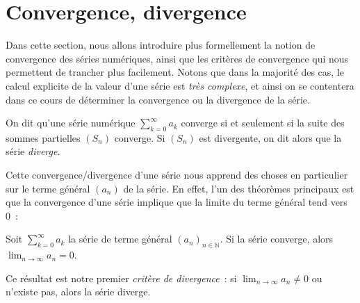 


\section{Convergence, divergence}
Dans cette section, nous allons introduire plus formellement la notion de convergence des séries numériques, ainsi que les critères de convergence qui nous permettent de trancher plus facilement. Notons que dans la majorité des cas, le calcul explicite de la valeur d'une série est \emph{très complexe}, et ainsi on se contentera dans ce cours de déterminer la convergence ou la divergence de la série.

\begin{boxdef}
On dit qu'une série numérique $\displaystyle\sum_{k=0}^{\infty} a_k$ converge si et seulement si la suite des sommes partielles $(S_n)$ converge. Si $(S_n)$ est divergente, on dit alors que la série \emph{diverge}.
\end{boxdef}
Cette convergence/divergence d'une série nous apprend des choses en particulier sur le terme général $(a_n)$ de la série. En effet, l'un des théorèmes principaux est que la convergence d'une série implique que la limite du terme général tend vers 0~:
\begin{boxthm}\label{thm:condition_necessaire}
Soit $\displaystyle\sum_{k=0}^{\infty} a_k$ la série de terme général $(a_n)_{n \in \mathbb{N}}$. Si la série converge, alors $\displaystyle\lim_{n \to \infty} a_n = 0$.
\end{boxthm}
Ce résultat est notre premier \emph{critère de divergence}~: si $\displaystyle\lim_{n \to \infty} a_n \neq 0$ ou n'existe pas, alors la série diverge.

